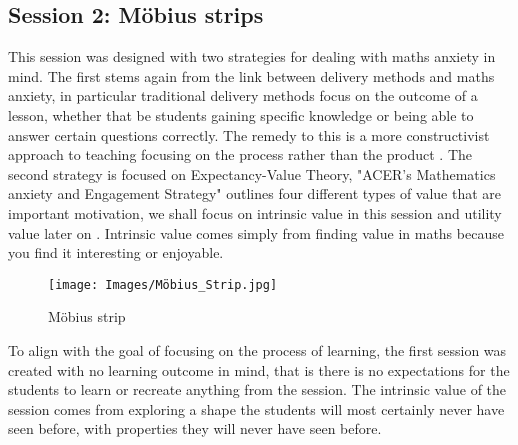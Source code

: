 \documentclass[11pt, a4paper, notitlepage]{article}
\begin{document}
\subsection{Session 2: M\"obius strips}
This session was designed with two strategies for dealing with maths anxiety in mind. The first stems again from the link between delivery methods and maths anxiety, in particular traditional delivery methods focus on the outcome of a lesson, whether that be students gaining specific knowledge or being able to answer certain questions correctly. The remedy to this is a more constructivist approach to teaching focusing on the process rather than the product \cite{Finlayson:2014}. The second strategy is focused on Expectancy-Value Theory, "ACER's Mathematics anxiety and Engagement Strategy" outlines four different types of value that are important motivation, we shall focus on intrinsic value in this session and utility value later on \cite{MAES:2024} . Intrinsic value comes simply from finding value in maths because you find it interesting or enjoyable.

\begin{wrapfigure}{r}{0.3\textwidth}
\texttt{[image: Images/Möbius\_Strip.jpg]}
\caption{M\"obius strip}
\end{wrapfigure}
\par

To align with the goal of focusing on the process of learning, the first session was created with no learning outcome in mind, that is there is no expectations for the students to learn or recreate anything from the session. The intrinsic value of the session comes from exploring a shape the students will most certainly never have seen before, with properties they will never have seen before. 

\vspace{1em}
\end{document}
